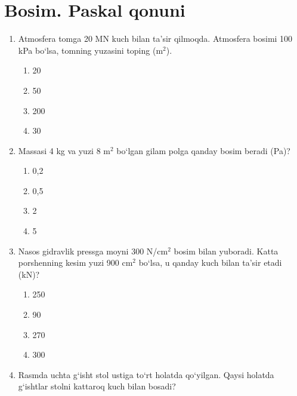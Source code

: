 \section{Bosim. Paskal qonuni}

\begin{enumerate}

\item Atmosfera tomga 20 MN kuch bilan ta’sir qilmoqda. Atmosfera bosimi 100 kPa 
bo‘lsa, tomning yuzasini toping (m$^2$). 

\begin{enumerate}[label=\Alph*)]
\item 20
\item 50
\item 200
\item 30
\end{enumerate}



\item Massasi 4 kg va yuzi 8 m$^2$ bo‘lgan gilam polga qanday bosim beradi (Pa)? 

\begin{enumerate}[label=\Alph*)]
\item 0,2
\item 0,5
\item 2
\item 5
\end{enumerate}

\item Nasos gidravlik pressga moyni 300 N/cm$^2$ bosim bilan yuboradi. 
Katta porshenning kesim yuzi 900 cm$^2$ bo‘lsa, u qanday kuch bilan ta’sir etadi (kN)? 
\begin{enumerate}[label=\Alph*)]
\item 250
\item 90
\item 270
\item 300

\end{enumerate}

\item Rasmda uchta g‘isht stol ustiga to‘rt holatda qo‘yilgan. Qaysi holatda g‘ishtlar stolni kattaroq kuch bilan bosadi? 

\end{enumerate}
